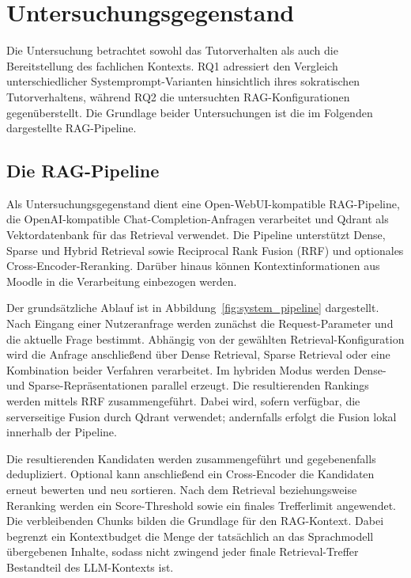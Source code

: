 \section{Untersuchungsgegenstand}
\label{sec:untersuchungsgegenstand}
 
Die Untersuchung betrachtet sowohl das Tutorverhalten als auch die Bereitstellung des fachlichen Kontexts. RQ1 adressiert den Vergleich unterschiedlicher Systemprompt-Varianten hinsichtlich ihres sokratischen Tutorverhaltens, während RQ2 die untersuchten RAG-Konfigurationen gegenüberstellt. Die Grundlage beider Untersuchungen ist die im Folgenden dargestellte RAG-Pipeline.
 
\subsection{Die RAG-Pipeline}
\label{subsec:rag_pipeline}
 
Als Untersuchungsgegenstand dient eine Open-WebUI-kompatible RAG-Pipeline, die OpenAI-kompatible Chat-Completion-Anfragen verarbeitet und Qdrant als Vektordatenbank für das Retrieval verwendet. Die Pipeline unterstützt Dense, Sparse und Hybrid Retrieval sowie Reciprocal Rank Fusion (RRF) und optionales Cross-Encoder-Reranking. Darüber hinaus können Kontextinformationen aus Moodle in die Verarbeitung einbezogen werden.
 
Der grundsätzliche Ablauf ist in Abbildung~\ref{fig:system_pipeline} dargestellt. Nach Eingang einer Nutzeranfrage werden zunächst die Request-Parameter und die aktuelle Frage bestimmt. Abhängig von der gewählten Retrieval-Konfiguration wird die Anfrage anschließend über Dense Retrieval, Sparse Retrieval oder eine Kombination beider Verfahren verarbeitet. Im hybriden Modus werden Dense- und Sparse-Repräsentationen parallel erzeugt. Die resultierenden Rankings werden mittels RRF zusammengeführt. Dabei wird, sofern verfügbar, die serverseitige Fusion durch Qdrant verwendet; andernfalls erfolgt die Fusion lokal innerhalb der Pipeline.
 
Die resultierenden Kandidaten werden zusammengeführt und gegebenenfalls dedupliziert. Optional kann anschließend ein Cross-Encoder die Kandidaten erneut bewerten und neu sortieren. Nach dem Retrieval beziehungsweise Reranking werden ein Score-Threshold sowie ein finales Trefferlimit angewendet. Die verbleibenden Chunks bilden die Grundlage für den RAG-Kontext. Dabei begrenzt ein Kontextbudget die Menge der tatsächlich an das Sprachmodell übergebenen Inhalte, sodass nicht zwingend jeder finale Retrieval-Treffer Bestandteil des LLM-Kontexts ist.
 
